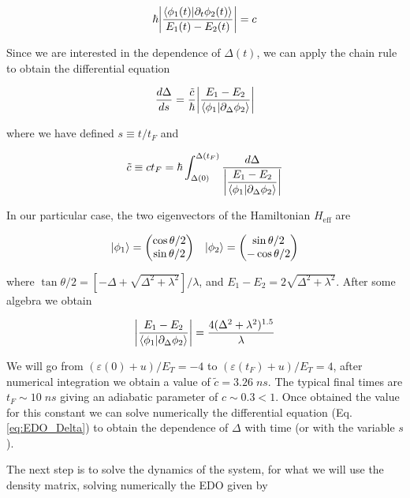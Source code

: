 \documentclass[aip,rsi,amsmath,amssymb,reprint, english]{revtex4-1}
\begin{document}
\begin{equation}
	\hbar\abs{\dfrac{\braket{\phi_1(t)}{\partial_t\phi_2(t)}}{E_1(t)-E_2(t)}}=c
\end{equation}

Since we are interested in the dependence of $\Delta(t)$, we can apply the chain rule to obtain the differential equation

\begin{equation}
	\dfrac{d \Delta}{ds}=\dfrac{\tilde{c}}{\hbar}\abs{\dfrac{E_1-E_2}{\braket{\phi_1}{\partial_{\Delta}\phi_2}}}
	\label{eq:EDO_Delta}
\end{equation}

where we have defined $s\equiv t/t_F$ and 

\begin{equation}
	\tilde{c}\equiv ct_F=\hbar\int^{\Delta(t_F)}_{\Delta(0)}\dfrac{d\Delta}{\abs{\dfrac{E_1-E_2}{\braket{\phi_1}{\partial_{\Delta}\phi_2}}}}
\end{equation}

In our particular case, the two eigenvectors of the Hamiltonian $H_{\text{eff}}$ are

\begin{equation}
	\begin{array}{cc}
	\ket{\phi_1}=\mqty(\cos\theta/2 \\ \sin \theta/2) & \ket{\phi_2}=\mqty(\sin\theta/2 \\ -\cos\theta/2)
	\end{array}
\end{equation}

where $\tan\theta/2=[-\Delta+\sqrt{\Delta^2+\lambda^2}]/\lambda$, and $E_1-E_2=2\sqrt{\Delta^2+\lambda^2}$. After some algebra we obtain

\begin{equation}
	\abs{\dfrac{E_1-E_2}{\braket{\phi_1}{\partial_{\Delta}\phi_2}}}=\dfrac{4(\Delta^2+\lambda^2)^{1.5}}{\lambda}
\end{equation}

We will go from $(\varepsilon(0)+u)/E_T=-4$ to $(\varepsilon(t_F)+u)/E_T=4$, after numerical integration we obtain a value of $\tilde{c}=3.26 \; ns$. The typical final times are $t_F\sim 10 \; ns$ giving an adiabatic parameter of $c\sim 0.3<1$. Once obtained the value for this constant we can solve numerically the differential equation (Eq. \ref{eq:EDO_Delta}) to obtain the dependence of $\Delta$ with time (or with the variable $s$).

The next step is to solve the dynamics of the system, for what we will use the density matrix, solving numerically the EDO given by
\end{document}
